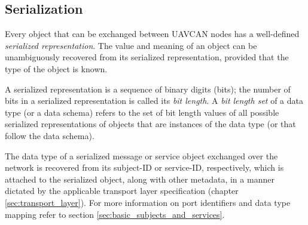 \subsection{Serialization}

Every object that can be exchanged between UAVCAN nodes has a well-defined \emph{serialized representation}.
The value and meaning of an object can be unambiguously recovered from its serialized representation,
provided that the type of the object is known.

\label{sec:dsdl_bit_length_set}
A serialized representation is a sequence of binary digits (bits);
the number of bits in a serialized representation is called its \emph{bit length}.
A \emph{bit length set} of a data type (or a data schema) refers to the set of bit length values of all possible
serialized representations of objects that are instances of the data type (or that follow the data schema).

The data type of a serialized message or service object exchanged over the network
is recovered from its subject-ID or service-ID, respectively,
which is attached to the serialized object, along with other metadata, in a manner dictated by the applicable
transport layer specification (chapter \ref{sec:transport_layer}).
For more information on port identifiers and data type mapping refer to section \ref{sec:basic_subjects_and_services}.
